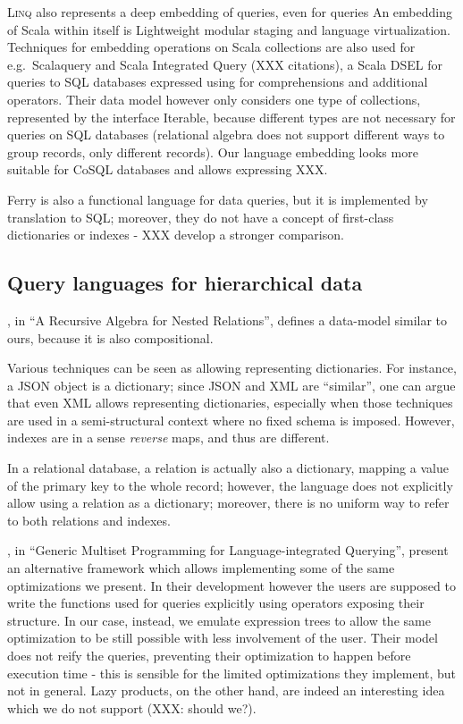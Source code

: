 \documentclass[preprint,authoryear,10pt]{sigplanconf}
\begin{document}
\textsc{Linq} also represents a deep embedding of queries, even for
queries An embedding of Scala within itself is Lightweight modular
staging and language virtualization. Techniques for embedding operations
on Scala collections are also used for e.g.~Scalaquery and Scala
Integrated Query (XXX citations), a Scala DSEL for queries to SQL
databases expressed using for comprehensions and additional operators.
Their data model however only considers one type of collections,
represented by the interface Iterable, because different types are not
necessary for queries on SQL databases (relational algebra does not
support different ways to group records, only different records). Our
language embedding looks more suitable for CoSQL databases and allows
expressing XXX.

Ferry is also a functional language for data queries, but it is
implemented by translation to SQL; moreover, they do not have a concept
of first-class dictionaries or indexes - XXX develop a stronger
comparison.

\subsection{Query languages for hierarchical data}

\citet{Colby90}, in ``A Recursive Algebra for Nested Relations'',
defines a data-model similar to ours, because it is also compositional.

Various techniques can be seen as allowing representing dictionaries.
For instance, a JSON object is a dictionary; since JSON and XML are
``similar'', one can argue that even XML allows representing
dictionaries, especially when those techniques are used in a
semi-structural context where no fixed schema is imposed. However,
indexes are in a sense \emph{reverse} maps, and thus are different.

In a relational database, a relation is actually also a dictionary,
mapping a value of the primary key to the whole record; however, the
language does not explicitly allow using a relation as a dictionary;
moreover, there is no uniform way to refer to both relations and
indexes.

\citet{Henglein10}, in ``Generic Multiset Programming for
Language-integrated Querying'', present an alternative framework which
allows implementing some of the same optimizations we present. In their
development however the users are supposed to write the functions used
for queries explicitly using operators exposing their structure. In our
case, instead, we emulate expression trees to allow the same
optimization to be still possible with less involvement of the user.
Their model does not reify the queries, preventing their optimization to
happen before execution time - this is sensible for the limited
optimizations they implement, but not in general. Lazy products, on the
other hand, are indeed an interesting idea which we do not support (XXX:
should we?).
\end{document}
